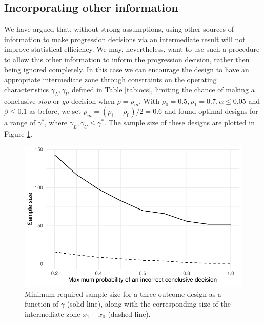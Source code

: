 \documentclass[sagev]{sagej}
\begin{document}

\subsection{Incorporating other information}\label{sec:information}

We have argued that, without strong assumptions, using other sources of information to make progression decisions via an intermediate result will not improve statistical efficiency. We may, nevertheless, want to use such a procedure to allow this other information to inform the progression decision, rather then being ignored completely. In this case we can encourage the design to have an appropriate intermediate zone through constraints on the operating characteristics $\gamma_L, \gamma_U$ defined in Table \ref{tab:ocs}, limiting the chance of making a conclusive \emph{stop} or \emph{go} decision when $\rho = \rho_m$. With $\rho_0 = 0.5, \rho_1 = 0.7, \alpha \leq 0.05$ and $\beta \leq 0.1$ as before, we set $\rho_m = (\rho_1 - \rho_0)/2 = 0.6$ and found optimal designs for a range of $\gamma^*$, where $\gamma_L, \gamma_U \leq \gamma^*$. The sample size of these designs are plotted in Figure \ref{fig:gamma_ns}.

\begin{figure}
\centering
\includegraphics[scale=0.8]{./figures/gamma_ns}
\caption{Minimum required sample size for a three-outcome design as a function of $\gamma$ (solid line), along with the corresponding size of the intermediate zone $x_1 - x_0$ (dashed line).}
\label{fig:gamma_ns}
\end{figure}
\end{document}
